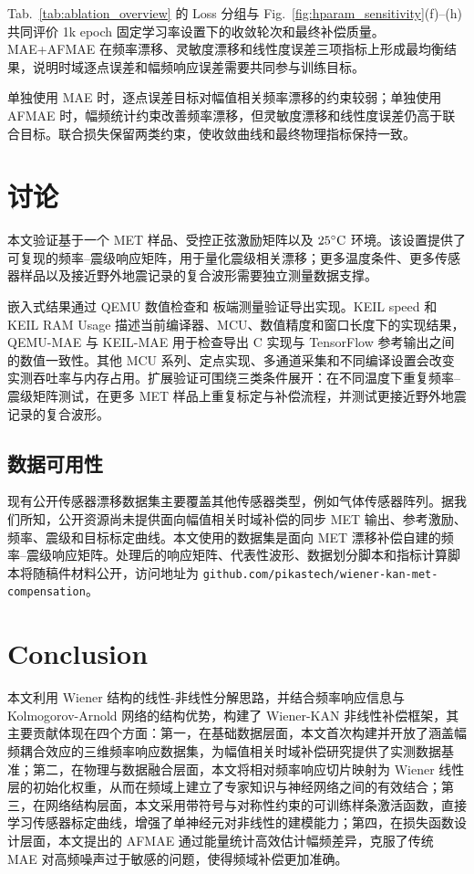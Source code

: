 \documentclass[sn-nature]{sn-jnl}
\begin{document}
Tab.~\ref{tab:ablation_overview} 的 Loss 分组与 Fig.~\ref{fig:hparam_sensitivity}(f)--(h) 共同评价 1k epoch 固定学习率设置下的收敛轮次和最终补偿质量。MAE+AFMAE 在频率漂移、灵敏度漂移和线性度误差三项指标上形成最均衡结果，说明时域逐点误差和幅频响应误差需要共同参与训练目标。

单独使用 MAE 时，逐点误差目标对幅值相关频率漂移的约束较弱；单独使用 AFMAE 时，幅频统计约束改善频率漂移，但灵敏度漂移和线性度误差仍高于联合目标。联合损失保留两类约束，使收敛曲线和最终物理指标保持一致。

\FloatBarrier

\section{讨论}


本文验证基于一个 MET 样品、受控正弦激励矩阵以及 $25^\circ\text{C}$ 环境。该设置提供了可复现的频率--震级响应矩阵，用于量化震级相关漂移；更多温度条件、更多传感器样品以及接近野外地震记录的复合波形需要独立测量数据支撑。

嵌入式结果通过 QEMU 数值检查和 \valTargetMcu{} 板端测量验证导出实现。KEIL speed 和 KEIL RAM Usage 描述当前编译器、MCU、数值精度和窗口长度下的实现结果，QEMU-MAE 与 KEIL-MAE 用于检查导出 C 实现与 TensorFlow 参考输出之间的数值一致性。其他 MCU 系列、定点实现、多通道采集和不同编译设置会改变实测吞吐率与内存占用。扩展验证可围绕三类条件展开：在不同温度下重复频率--震级矩阵测试，在更多 MET 样品上重复标定与补偿流程，并测试更接近野外地震记录的复合波形。

\subsection{数据可用性}

现有公开传感器漂移数据集主要覆盖其他传感器类型，例如气体传感器阵列\cite{vergaraChemicalGasSensor2012}。据我们所知，公开资源尚未提供面向幅值相关时域补偿的同步 MET 输出、参考激励、频率、震级和目标标定曲线。本文使用的数据集是面向 MET 漂移补偿自建的频率--震级响应矩阵。处理后的响应矩阵、代表性波形、数据划分脚本和指标计算脚本将随稿件材料公开，访问地址为 \texttt{github.com/pikastech/wiener-kan-met-compensation}。

\FloatBarrier

\section{Conclusion}

本文利用 Wiener 结构的线性-非线性分解思路，并结合频率响应信息与 Kolmogorov-Arnold 网络的结构优势，构建了 Wiener-KAN 非线性补偿框架，其主要贡献体现在四个方面：第一，在基础数据层面，本文首次构建并开放了涵盖幅频耦合效应的三维频率响应数据集，为幅值相关时域补偿研究提供了实测数据基准；第二，在物理与数据融合层面，本文将相对频率响应切片映射为 Wiener 线性层的初始化权重，从而在频域上建立了专家知识与神经网络之间的有效结合；第三，在网络结构层面，本文采用带符号与对称性约束的可训练样条激活函数，直接学习传感器标定曲线，增强了单神经元对非线性的建模能力；第四，在损失函数设计层面，本文提出的 AFMAE 通过能量统计高效估计幅频差异，克服了传统 MAE 对高频噪声过于敏感的问题，使得频域补偿更加准确。
\end{document}
